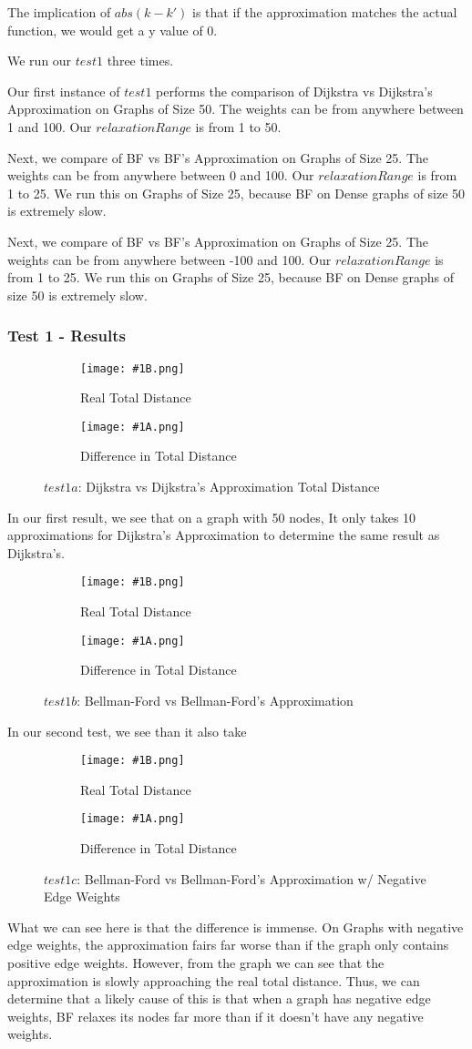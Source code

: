 \documentclass{article}
\newcommand{\expOneTestOneFigure}[2]
{
    \begin{figure}[ht!]
        \begin{subfigure}[t]{.48\textwidth}
            \centering
            \texttt{[image: \#1B.png]}
            \caption{Real Total Distance}
        \end{subfigure}\hfill
        \begin{subfigure}[t]{.48\textwidth}
            \centering
            \texttt{[image: \#1A.png]}
            \caption{Difference in Total Distance}
        \end{subfigure}
    \caption{#2}
    \end{figure}
}
\begin{document}
The implication of $abs(k - k')$ is that if the approximation matches the actual function, we would get a y value of 0.

We run our $test1$ three times.

Our first instance of $test1$ performs the comparison of Dijkstra vs Dijkstra's Approximation on Graphs of Size 50. The weights can be from anywhere between 1 and 100. Our $relaxationRange$ is from 1 to 50.

Next, we compare of BF vs BF's Approximation on Graphs of Size 25. The weights can be from anywhere between 0 and 100. Our $relaxationRange$ is from 1 to 25. We run this on Graphs of Size 25, because BF on Dense graphs of size 50 is extremely slow.

Next, we compare of BF vs BF's Approximation on Graphs of Size 25. The weights can be from anywhere between -100 and 100. Our $relaxationRange$ is from 1 to 25. We run this on Graphs of Size 25, because BF on Dense graphs of size 50 is extremely slow.

\subsubsection{Test 1 - Results}

\FloatBarrier{}
\expOneTestOneFigure{images/part1/exp1_1a}{$test1a$: Dijkstra vs Dijkstra's Approximation Total Distance}
\FloatBarrier{}

In our first result, we see that on a graph with 50 nodes, It only takes 10 approximations for Dijkstra's Approximation to determine the same result as Dijkstra's.

\FloatBarrier{}
\expOneTestOneFigure{images/part1/exp1_1b}{$test1b$: Bellman-Ford vs Bellman-Ford's Approximation}
\FloatBarrier{}

In our second test, we see than it also take

\FloatBarrier{}
\expOneTestOneFigure{images/part1/exp1_1c}{$test1c$: Bellman-Ford vs Bellman-Ford's Approximation w/ Negative Edge Weights}
\FloatBarrier{}

What we can see here is that the difference is immense. On Graphs with negative edge weights, the approximation fairs far worse than if the graph only contains positive edge weights. However, from the graph we can see that the approximation is slowly approaching the real total distance. 
Thus, we can determine that a likely cause of this is that when a graph has negative edge weights, BF relaxes its nodes far more than if it doesn't have any negative weights.
\end{document}
